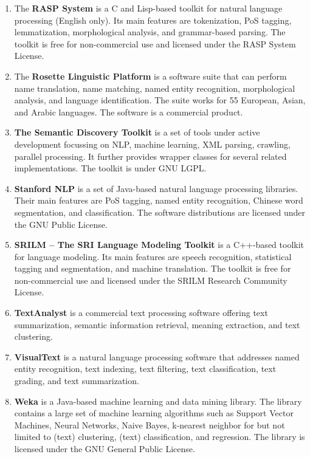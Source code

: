 \begin{enumerate}
	\item The \textbf{RASP System} \cite{briscoe2006second} is a C and Lisp-based toolkit for natural language processing (English only). Its main features are tokenization, PoS tagging, lemmatization, morphological analysis, and grammar-based parsing.
The toolkit is free for non-commercial use and licensed under the RASP System License.

	\item The \textbf{Rosette Linguistic Platform} \cite{rosette} is a software suite that can perform name translation, name matching, named entity recognition, morphological analysis, and language identification. The suite works for 55 European, Asian, and Arabic languages.
The software is a commercial product.

	\item \textbf{The Semantic Discovery Toolkit} \cite{semanticdiscovery} is a set of tools under active development focussing on NLP, machine learning, XML parsing, crawling, parallel processing. It further provides wrapper classes for several related implementations. The toolkit is under GNU LGPL.

	\item \textbf{Stanford NLP} \cite{stanfordnlp} is a set of Java-based natural language processing libraries. Their main features are PoS tagging, named entity recognition, Chinese word segmentation, and classification.
The software distributions are licensed under the GNU Public License.

	\item \textbf{SRILM -- The SRI Language Modeling Toolkit} \cite{stolcke2002srilm} is a C++-based toolkit for language modeling. Its main features are speech recognition, statistical tagging and segmentation, and machine translation.
The toolkit is free for non-commercial use and licensed under the SRILM Research Community License.

	\item \textbf{TextAnalyst} \cite{textanalyst} is a commercial text processing software offering text summarization, semantic information retrieval, meaning extraction, and text clustering.

	\item \textbf{VisualText} \cite{visualtext} is a natural language processing software that addresses named entity recognition, text indexing, text filtering, text classification, text grading, and text summarization.

	\item \textbf{Weka} \cite{hall2009weka} is a Java-based machine learning and data mining library. The library contains a large set of machine learning algorithms such as Support Vector Machines, Neural Networks, Naive Bayes, k-nearest neighbor for but not limited to (text) clustering, (text) classification, and regression.
The library is licensed under the GNU General Public License.

\end{enumerate}
